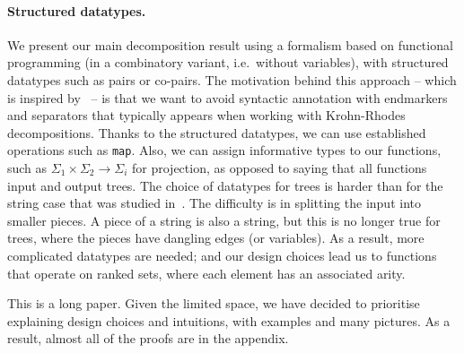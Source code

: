 \paragraph*{Structured datatypes.} We present our main decomposition result using a formalism based on  functional programming (in a combinatory variant, i.e.~without variables), with structured datatypes such as pairs or co-pairs.  The motivation behind this approach  -- which is inspired by~\cite{bojanczykRegularFirstOrderList2018} -- is that we want to avoid syntactic annotation with endmarkers and separators that typically appears when working with Krohn-Rhodes decompositions. Thanks to the  structured datatypes,  we can use established operations such as {\tt map}. Also, we can assign informative types to our functions, such as $\Sigma_1 \times \Sigma_2 \to \Sigma_i$ for projection, as opposed to saying that all functions input and output trees.  The choice of datatypes for trees is harder than for the string case that was studied in~\cite{bojanczykRegularFirstOrderList2018}.  The difficulty is in splitting the input into smaller pieces. A piece of a string is also a string, but this is no longer true for trees, where the pieces have dangling edges (or variables). As a result, more complicated  datatypes are needed; and our design choices lead us to functions that operate on ranked sets, where each element has an associated arity.
 


This is a long paper. Given the limited space, we have decided to prioritise  explaining  design choices and intuitions, with  examples and many pictures. As a result, almost all of the proofs are in the appendix. 




